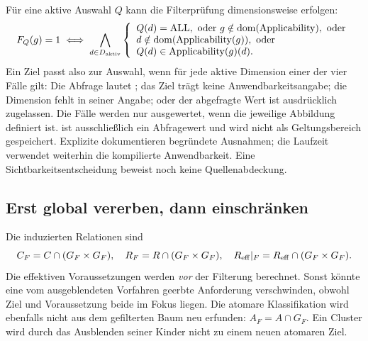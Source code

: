 Für eine aktive Auswahl $Q$ kann die Filterprüfung dimensionsweise erfolgen:
\[
 F_Q(g)=1\iff\bigwedge_{d\in D_{\mathrm{aktiv}}}
 \left\{
 \begin{array}{l}
 Q(d)=\mathrm{ALL},\ \text{oder}\ g\notin\operatorname{dom}(\Applicability),\ \text{oder}\\
 d\notin\operatorname{dom}(\Applicability(g)),\ \text{oder}\\
 Q(d)\in \Applicability(g)(d).
 \end{array}\right.
\]
Ein Ziel passt also zur Auswahl, wenn für jede aktive Dimension einer der
vier Fälle gilt: Die Abfrage lautet ; das Ziel trägt keine
Anwendbarkeitsangabe; die Dimension fehlt in seiner Angabe; oder der
abgefragte Wert ist ausdrücklich zugelassen.
Die Fälle werden nur ausgewertet, wenn die jeweilige Abbildung definiert
ist.  ist ausschließlich ein Abfragewert und wird nicht als
Geltungsbereich gespeichert. Explizite 
dokumentieren begründete Ausnahmen; die Laufzeit verwendet weiterhin die
kompilierte Anwendbarkeit. Eine Sichtbarkeitsentscheidung beweist noch keine
Quellenabdeckung.

\subsection{Erst global vererben, dann einschränken}
Die induzierten Relationen sind
\[
 C_F=C\cap(G_F\times G_F),\quad R_F=R\cap(G_F\times G_F),\quad
 R_{\mathrm{eff}}|_F=R_{\mathrm{eff}}\cap(G_F\times G_F).
\]
Die effektiven Voraussetzungen werden \emph{vor} der Filterung berechnet.
Sonst könnte eine vom ausgeblendeten Vorfahren geerbte Anforderung
verschwinden, obwohl Ziel und Voraussetzung beide im Fokus liegen.
Die atomare Klassifikation wird ebenfalls nicht aus dem gefilterten Baum
neu erfunden: $A_F=A\cap G_F$. Ein Cluster wird durch das Ausblenden
seiner Kinder nicht zu einem neuen atomaren Ziel.

